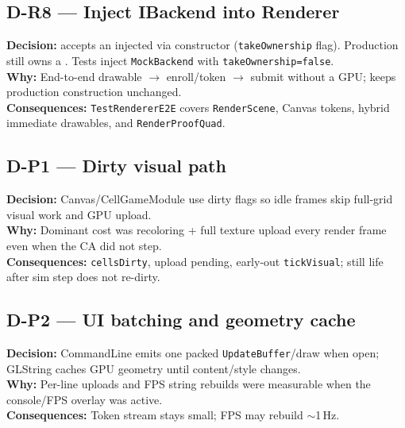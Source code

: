 \subsection*{D-R8 --- Inject IBackend into Renderer}
\begin{decisionbox}[title={D-R8 \quad 2026-07-28}]
\textbf{Decision:}  accepts an injected 
via constructor (\texttt{takeOwnership} flag). Production still owns a
. Tests inject \texttt{MockBackend} with
\texttt{takeOwnership=false}.\\
\textbf{Why:} End-to-end drawable $\rightarrow$ enroll/token $\rightarrow$ submit
without a GPU; keeps production construction unchanged.\\
\textbf{Consequences:} \texttt{TestRendererE2E} covers \texttt{RenderScene},
Canvas tokens, hybrid immediate drawables, and \texttt{RenderProofQuad}.
\end{decisionbox}

\subsection*{D-P1 --- Dirty visual path}
\begin{decisionbox}[title={D-P1 \quad 2026-07-28}]
\textbf{Decision:} Canvas/CellGameModule use dirty flags so idle frames skip
full-grid visual work and GPU upload.\\
\textbf{Why:} Dominant cost was recoloring + full texture upload every render
frame even when the CA did not step.\\
\textbf{Consequences:} \texttt{cellsDirty}, upload pending, early-out
\texttt{tickVisual}; still life after sim step does not re-dirty.
\end{decisionbox}

\subsection*{D-P2 --- UI batching and geometry cache}
\begin{decisionbox}[title={D-P2 \quad 2026-07-28}]
\textbf{Decision:} CommandLine emits one packed \texttt{UpdateBuffer}/draw when
open; GLString caches GPU geometry until content/style changes.\\
\textbf{Why:} Per-line uploads and FPS string rebuilds were measurable when the
console/FPS overlay was active.\\
\textbf{Consequences:} Token stream stays small; FPS may rebuild $\sim$1\,Hz.
\end{decisionbox}

